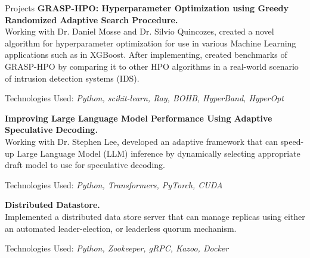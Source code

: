 \begin{rSection}{Projects}
    \textbf{GRASP-HPO: Hyperparameter Optimization using Greedy Randomized Adaptive Search Procedure.}\\
    {Working with Dr. Daniel Mosse and Dr. Silvio Quincozes, created a novel algorithm for hyperparameter optimization for use in various Machine Learning applications such as in XGBoost. After implementing, created benchmarks of GRASP-HPO by comparing it to other HPO algorithms in a real-world scenario of intrusion detection systems (IDS).}
    \begin{description}\vspace{-0.5em}
        \item Technologies Used: \textit{Python, scikit-learn, Ray, BOHB, HyperBand, HyperOpt}
    \end{description}
    
    \textbf{Improving Large Language Model Performance Using Adaptive Speculative Decoding.}\\
    {Working with Dr. Stephen Lee, developed an adaptive framework that can speed-up Large Language Model (LLM) inference by dynamically selecting appropriate draft model to use for speculative decoding.}
    \begin{description}\vspace{-0.5em}
        \item Technologies Used: \textit{Python, Transformers, PyTorch, CUDA}
    \end{description}

\textbf{Distributed Datastore.}\\
    {Implemented a distributed data store server that can manage replicas using either an automated leader-election, or leaderless quorum mechanism.}
    \begin{description}\vspace{-0.5em}
        \item Technologies Used: \textit{Python, Zookeeper, gRPC, Kazoo, Docker}
    \end{description}


\end{rSection}
